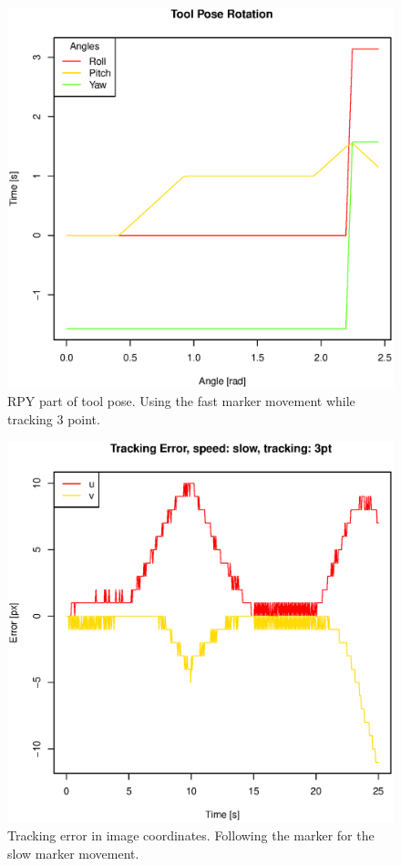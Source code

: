 \begin{figure}[H]
\centering
\includegraphics[width= \linewidth]{graphics/robotics/toolPose_fast_3pt}
\caption{RPY part of tool pose. Using the fast marker movement while tracking 3 point.}
\label{fig:toolpose_fast_3p_rpy}
\end{figure}


\begin{figure}[H]
\centering
\includegraphics[width= 0.9 \linewidth]{graphics/robotics/trackingError_slow_3pt}
\caption{Tracking error in image coordinates.
Following the marker for the slow marker movement.}
\label{fig:trackingerror_slow_3p}
\end{figure}

